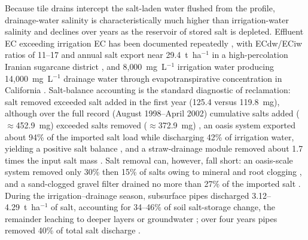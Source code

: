 Because tile drains intercept the salt-laden water flushed from the profile, drainage-water salinity is characteristically much higher than irrigation-water salinity and declines over years as the reservoir of stored salt is depleted. Effluent EC exceeding irrigation EC has been documented repeatedly \parencite{Li2022,Karegoudar2022}, with ECdw/ECiw ratios of 11--17 and annual salt export near 29.4~t~ha$^{-1}$ in a high-percolation Iranian sugarcane district \parencite{Akram2013}, and 8{,}000~mg~L$^{-1}$ irrigation water producing 14{,}000~mg~L$^{-1}$ drainage water through evapotranspirative concentration in California \parencite{KARAJEH1994c}. Salt-balance accounting is the standard diagnostic of reclamation: salt removed exceeded salt added in the first year (125.4 versus 119.8~mg), although over the full record (August 1998--April 2002) cumulative salts added ($\approx$452.9~mg) exceeded salts removed ($\approx$372.9~mg) \parencite{Manjunatha2004}, an oasis system exported about 94\% of the imported salt load while discharging 42\% of irrigation water, yielding a positive salt balance \parencite{Askri2022}, and a straw-drainage module removed about 1.7 times the input salt mass \parencite{Lu2019}. Salt removal can, however, fall short: an oasis-scale system removed only 30\% then 15\% of salts owing to mineral and root clogging \parencite{BenAissa2013}, and a sand-clogged gravel filter drained no more than 27\% of the imported salt \parencite{HajAmor2019}. During the irrigation--drainage season, subsurface pipes discharged 3.12--4.29~t~ha$^{-1}$ of salt, accounting for 34--46\% of soil salt-storage change, the remainder leaching to deeper layers or groundwater \parencite{Liu2025c}; over four years pipes removed 40\% of total salt discharge \parencite{Heng2021}.


